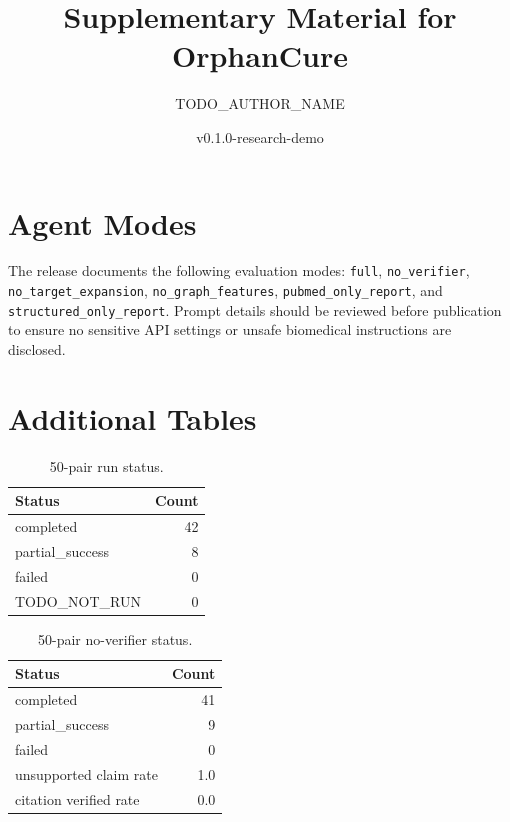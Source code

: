 \documentclass[11pt]{article}
\title{Supplementary Material for OrphanCure}
\author{TODO\_AUTHOR\_NAME}
\date{v0.1.0-research-demo}
\begin{document}
\maketitle

\section{Agent Modes}
The release documents the following evaluation modes: \texttt{full}, \texttt{no\_verifier}, \texttt{no\_target\_expansion}, \texttt{no\_graph\_features}, \texttt{pubmed\_only\_report}, and \texttt{structured\_only\_report}. Prompt details should be reviewed before publication to ensure no sensitive API settings or unsafe biomedical instructions are disclosed.

\section{Additional Tables}
\begin{table}[htbp]
\centering
\caption{50-pair run status.}
\begin{tabular}{lr}
\toprule
Status & Count \\
\midrule
completed & 42 \\
partial\_success & 8 \\
failed & 0 \\
TODO\_NOT\_RUN & 0 \\
\bottomrule
\end{tabular}
\end{table}

\begin{table}[htbp]
\centering
\caption{50-pair no-verifier status.}
\begin{tabular}{lr}
\toprule
Status & Count \\
\midrule
completed & 41 \\
partial\_success & 9 \\
failed & 0 \\
unsupported claim rate & 1.0 \\
citation verified rate & 0.0 \\
\bottomrule
\end{tabular}
\end{table}
\end{document}
